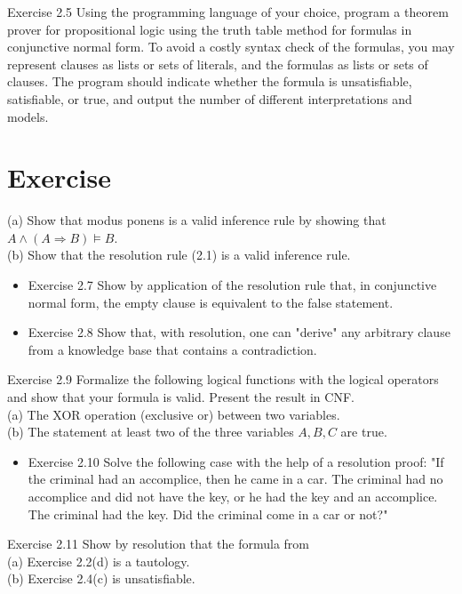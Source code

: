 \documentclass[10pt]{book}
\begin{document}
Exercise 2.5 Using the programming language of your choice, program a theorem prover for propositional logic using the truth table method for formulas in conjunctive normal form. To avoid a costly syntax check of the formulas, you may represent clauses as lists or sets of literals, and the formulas as lists or sets of clauses. The program should indicate whether the formula is unsatisfiable, satisfiable, or true, and output the number of different interpretations and models.

\section{Exercise}
(a) Show that modus ponens is a valid inference rule by showing that $A \wedge(A \Rightarrow B) \models B$.\\
(b) Show that the resolution rule (2.1) is a valid inference rule.

\begin{itemize}
  \item Exercise 2.7 Show by application of the resolution rule that, in conjunctive normal form, the empty clause is equivalent to the false statement.
  \item Exercise 2.8 Show that, with resolution, one can "derive" any arbitrary clause from a knowledge base that contains a contradiction.
\end{itemize}

Exercise 2.9 Formalize the following logical functions with the logical operators and show that your formula is valid. Present the result in CNF.\\
(a) The XOR operation (exclusive or) between two variables.\\
(b) The statement at least two of the three variables $A, B, C$ are true.

\begin{itemize}
  \item Exercise 2.10 Solve the following case with the help of a resolution proof: "If the criminal had an accomplice, then he came in a car. The criminal had no accomplice and did not have the key, or he had the key and an accomplice. The criminal had the key. Did the criminal come in a car or not?"
\end{itemize}

Exercise 2.11 Show by resolution that the formula from\\
(a) Exercise 2.2(d) is a tautology.\\
(b) Exercise 2.4(c) is unsatisfiable.
\end{document}
